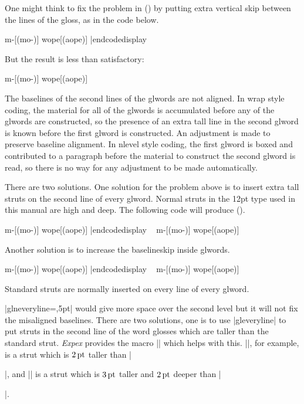 One might think to fix the problem in (\lastx) by putting extra
vertical skip between the lines of the gloss, as in the code below.

\codedisplay
\ex[glstyle=nlevel,glneveryline={\it},glnabovelineskip={,.5ex}]
\begingl m-[(mo-)] wope[(a\AccentedBarredW ope)] \endgl \xe
|endcodedisplay

But the result is less than satisfactory:

\framedisplay
\ex[glstyle=nlevel,glneveryline={\it},glnabovelineskip={,.5ex}]
\begingl m-[(mo-)] wope[(a\AccentedBarredW ope)] \endgl \xe
\endframedisplay

The baselines of the second lines of the glwords are not aligned.  In
wrap style coding, the material for all of the glwords is accumulated
before any of the glwords are constructed, so the presence of an extra
tall line in the second glword is known before the first glword is
constructed.  An adjustment is made to preserve baseline alignment.
In nlevel style coding, the first glword is boxed and contributed to a
paragraph before the material to construct the second glword is read,
so there is no way for any adjustment to be made automatically.

There are two solutions.  One solution for the problem above is to
insert extra tall struts on the second line of every glword.
Normal struts in the 12pt type used in this manual are \textdim{10 pt}
high and \textdim{4 pt} deep.  The following code will produce (\nextx).

\codedisplay
\ex[glstyle=nlevel,glneveryline={\it,\vrule height14pt width0pt}]
\begingl m-[(mo-)] wope[(a\AccentedBarredW ope)] \endgl
\xe
|endcodedisplay
\framedisplay~
\ex[glstyle=nlevel,glneveryline={\it,\vrule height14pt width0pt}]
\begingl m-[(mo-)] wope[(a\AccentedBarredW ope)] \endgl \xe
\endframedisplay

Another solution is to increase the baselineskip inside glwords.

\codedisplay
\ex[glstyle=nlevel,glneveryline={\it},everyglilg={\baselineskip=18pt}]
\begingl m-[(mo-)] wope[(a\AccentedBarredW ope)] \endgl \xe
|endcodedisplay
\framedisplay~
\ex[glstyle=nlevel,glneveryline={\it},everyglilg={\baselineskip=18pt}]
\begingl m-[(mo-)] wope[(a\AccentedBarredW ope)] \endgl
\xe
\endframedisplay




Standard struts are normally inserted on
every line of every glword.




|glneveryline={,5pt}| would give more space over the second level but
it will not fix the misaligned baselines. There are two solutions,
one is to use |gleveryline| to put struts in the second line of the
word glosses which are taller than the standard strut.  {\it Expex}
provides the macro |\varstrut| which helps with this.
|\varstrut{2pt}|, for example, is a strut which is $2\,\rm pt$ taller
than |\strut|, and |\varstrut{3pt 2pt}| is a strut which is $3\,\rm
pt$ taller and $2\,\rm pt$ deeper than |\strut|.

